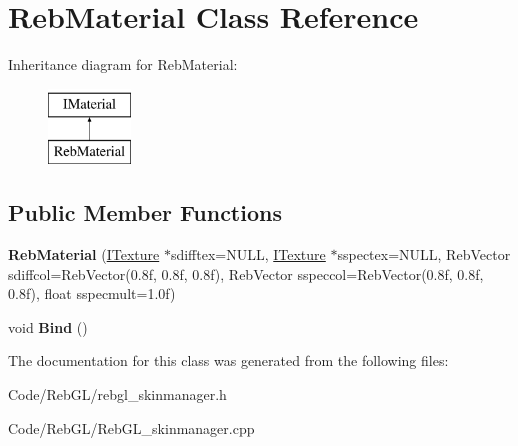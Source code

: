\hypertarget{class_reb_material}{}\section{Reb\+Material Class Reference}
\label{class_reb_material}
Inheritance diagram for Reb\+Material\+:\begin{figure}[H]
\begin{center}
\leavevmode
\includegraphics[height=2.000000cm]{class_reb_material}
\end{center}
\end{figure}
\subsection*{Public Member Functions}
\begin{DoxyCompactItemize}
\item 
{\bfseries Reb\+Material} (\hyperlink{class_i_texture}{I\+Texture} $\ast$sdifftex=N\+U\+LL, \hyperlink{class_i_texture}{I\+Texture} $\ast$sspectex=N\+U\+LL, Reb\+Vector sdiffcol=Reb\+Vector(0.\+8f, 0.\+8f, 0.\+8f), Reb\+Vector sspeccol=\+Reb\+Vector(0.\+8f, 0.\+8f, 0.\+8f), float sspecmult=1.\+0f)\hypertarget{class_reb_material_a74ede081ba36ac7ac51beb4cd006aabb}{}\label{class_reb_material_a74ede081ba36ac7ac51beb4cd006aabb}

\item 
void {\bfseries Bind} ()\hypertarget{class_reb_material_ac6440f627e4766d0f47a3d5b5a169e20}{}\label{class_reb_material_ac6440f627e4766d0f47a3d5b5a169e20}

\end{DoxyCompactItemize}


The documentation for this class was generated from the following files\+:\begin{DoxyCompactItemize}
\item 
Code/\+Reb\+G\+L/rebgl\+\_\+skinmanager.\+h\item 
Code/\+Reb\+G\+L/Reb\+G\+L\+\_\+skinmanager.\+cpp\end{DoxyCompactItemize}
